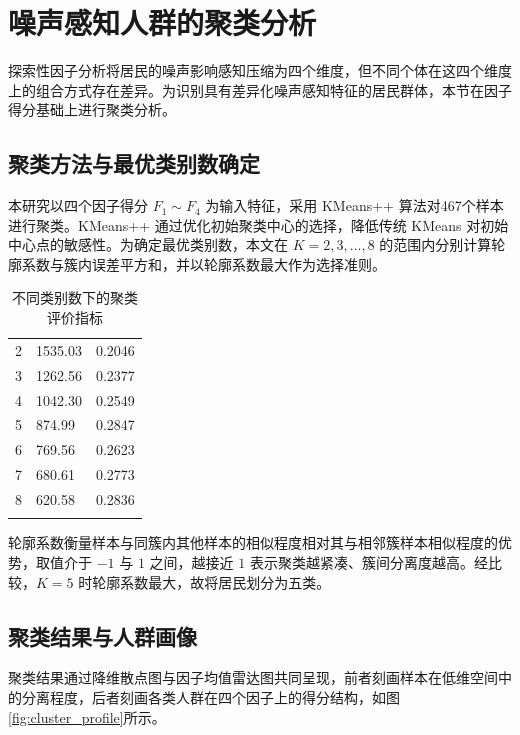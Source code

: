 \section{噪声感知人群的聚类分析}

探索性因子分析将居民的噪声影响感知压缩为四个维度，但不同个体在这四个维度上的组合方式存在差异。为识别具有差异化噪声感知特征的居民群体，本节在因子得分基础上进行聚类分析。

\subsection{聚类方法与最优类别数确定}

本研究以四个因子得分 $F_1\sim F_4$ 为输入特征，采用 KMeans++ 算法对467个样本进行聚类。KMeans++ 通过优化初始聚类中心的选择，降低传统 KMeans 对初始中心点的敏感性。为确定最优类别数，本文在 $K=2,3,\dots,8$ 的范围内分别计算轮廓系数与簇内误差平方和，并以轮廓系数最大作为选择准则。

\begin{table}[H]
\centering
\caption{不同类别数下的聚类评价指标}
\begin{tabular}{M{4cm}M{5cm}M{4cm}}
\bluetoprule
{}
 &  &  \\
 & 1535.03 & 0.2046 \\
3 & 1262.56 & 0.2377 \\
4 & 1042.30 & 0.2549 \\
5 & 874.99 & 0.2847 \\
6 & 769.56 & 0.2623 \\
7 & 680.61 & 0.2773 \\
8 & 620.58 & 0.2836 \\
\bluebottomrule
\end{tabular}
\end{table}

轮廓系数衡量样本与同簇内其他样本的相似程度相对其与相邻簇样本相似程度的优势，取值介于 $-1$ 与 $1$ 之间，越接近 $1$ 表示聚类越紧凑、簇间分离度越高。经比较，$K=5$ 时轮廓系数最大，故将居民划分为五类。

\subsection{聚类结果与人群画像}

聚类结果通过降维散点图与因子均值雷达图共同呈现，前者刻画样本在低维空间中的分离程度，后者刻画各类人群在四个因子上的得分结构，如图\ref{fig:cluster_profile}所示。

